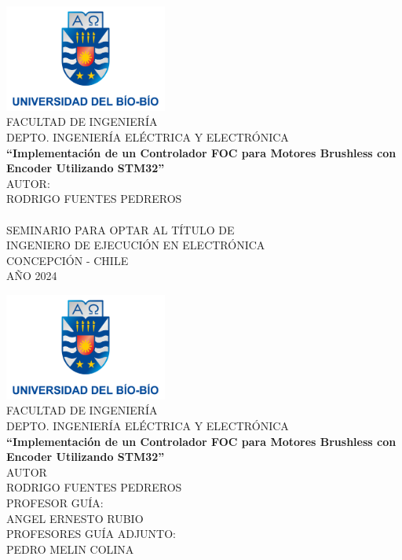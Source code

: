 \documentclass[11pt]{report}
\begin{document}
\begin{titlepage}
	\begin{center}
		\includegraphics[width=0.4\textwidth]{imagenes/logo_ubb.png}\\
		\normalsize FACULTAD DE INGENIERÍA\\
		DEPTO. INGENIERÍA ELÉCTRICA Y ELECTRÓNICA\\[2cm]

		\LARGE \textbf{``Implementación de un Controlador FOC para Motores Brushless con Encoder Utilizando STM32''}\\[6cm]

		\normalsize AUTOR:\\
		RODRIGO FUENTES PEDREROS\\
		\href{https://www.youtube.com/watch?v=dQw4w9WgXcQ}{\phantom{ASDF}}\\[2cm]

		SEMINARIO PARA OPTAR AL TÍTULO DE\\
		INGENIERO DE EJECUCIÓN EN ELECTRÓNICA\\[1cm]

		CONCEPCIÓN - CHILE\\
		AÑO 2024\\
	\end{center}
\end{titlepage}

\begin{titlepage}
	\begin{center}
		\includegraphics[width=0.4\textwidth]{imagenes/logo_ubb.png}\\
		\normalsize FACULTAD DE INGENIERÍA\\
		DEPTO. INGENIERÍA ELÉCTRICA Y ELECTRÓNICA\\[2cm]

		\LARGE \textbf{``Implementación de un Controlador FOC para Motores Brushless con Encoder Utilizando STM32''}\\[5cm]

		\normalsize AUTOR\\
		RODRIGO FUENTES PEDREROS\\[3cm]

		\large PROFESOR GUÍA:\\
		\large ANGEL ERNESTO RUBIO\\[1cm]
		\large PROFESORES GUÍA ADJUNTO:\\
		\large PEDRO MELIN COLINA
	\end{center}
\end{titlepage}
\end{document}
